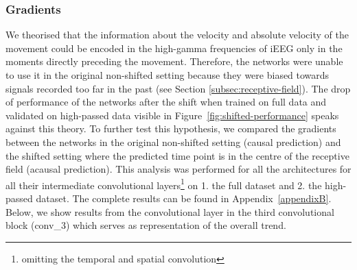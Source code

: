 \subsubsection{Gradients}
We theorised that the information about the velocity and absolute velocity of the movement could be encoded in the high-gamma frequencies of iEEG only in the moments directly preceding the movement.
Therefore, the networks were unable to use it in the original non-shifted setting because they were biased towards signals recorded too far in the past (see Section \ref{subsec:receptive-field}).
The drop of performance of the networks after the shift when trained on full data and validated on high-passed data visible in Figure~\ref{fig:shifted-performance} speaks against this theory. 
To further test this hypothesis, we compared the gradients between the networks in the original non-shifted setting (causal prediction) and the shifted setting where the predicted time point is in the centre of the receptive field (acausal prediction).
This analysis was performed for all the architectures for all their intermediate convolutional layers\footnote{omitting the temporal and spatial convolution} on 1. the full dataset and 2. the high-passed dataset.
The complete results can be found in Appendix~\ref{appendixB}.
Below, we show results from the convolutional layer in the third convolutional block (conv\_3) which serves as representation of the overall trend. 

